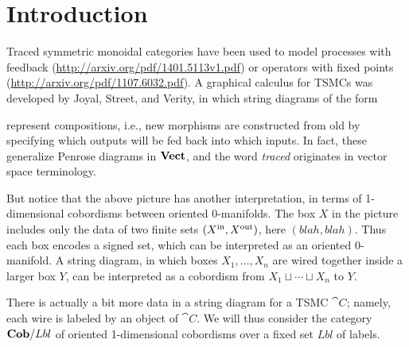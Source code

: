 \chapter{Introduction}

Traced symmetric monoidal categories have been used to model processes with feedback (\url{http://arxiv.org/pdf/1401.5113v1.pdf})  or operators with fixed points (\url{http://arxiv.org/pdf/1107.6032.pdf}). A graphical calculus for TSMCs was developed by Joyal, Street, and Verity, in which string diagrams of the form
\begin{center}\end{center}
represent compositions, i.e., new morphisms are constructed from old by specifying which outputs will be fed back into which inputs. In fact, these generalize Penrose diagrams in $\mathbf{Vect}$, and the word \emph{traced} originates in vector space terminology.  

But notice that the above picture has another interpretation, in terms of 1-dimensional cobordisms between oriented 0-manifolds. The box $X$ in the picture includes only the data of two finite sets $(X^{\text{in}},X^{\text{out}})$, here $(blah,blah)$. Thus each box encodes a signed set, which can be interpreted as an oriented 0-manifold. A string diagram, in which boxes $X_1,\ldots,X_n$ are wired together inside a larger box $Y$, can be interpreted as a cobordism from $X_1\sqcup\cdots\sqcup X_n$ to $Y$. 

There is actually a bit more data in a string diagram for a TSMC $\cat{C}$; namely, each wire is labeled by an object of $\cat{C}$. We will thus consider the category $\mathbf{Cob}/Lbl$ of oriented 1-dimensional cobordisms over a fixed set $Lbl$ of labels. 

